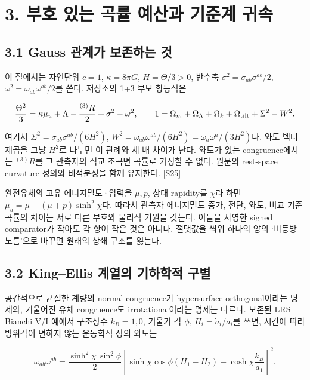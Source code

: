 \documentclass[11pt,a4paper]{article}
\begin{document}
\hypertarget{s3}{}

\section*{3. 부호 있는 곡률 예산과 기준계 귀속}


\subsection*{3.1 Gauss 관계가 보존하는 것}

이 절에서는 자연단위 \(c=1\), \(\kappa=8\pi G\), \(H=\Theta/3>0\), 반수축 \(\sigma^2=\sigma_{ab}\sigma^{ab}/2\), \(\omega^2=\omega_{ab}\omega^{ab}/2\)를 쓴다. 저장소의 1+3 부모 항등식은


\[
\frac{\Theta^2}{3}=\kappa\mu_u+\Lambda-\frac{{}^{(3)}R}{2}
+\sigma^2-\omega^2,
\qquad
1=\Omega_m+\Omega_\Lambda+\Omega_k+\Omega_{\rm tilt}+\Sigma^2-W^2.
\]

여기서 \(\Sigma^2=\sigma_{ab}\sigma^{ab}/(6H^2)\), \(W^2=\omega_{ab}\omega^{ab}/(6H^2)=\omega_a\omega^a/(3H^2)\)다. 와도 벡터 제곱을 그냥 \(H^2\)로 나누면 이 관례와 세 배 차이가 난다. 와도가 있는 congruence에서는 \({}^{(3)}R\)를 그 관측자의 직교 초곡면 곡률로 가정할 수 없다. 원문의 rest-space curvature 정의와 비적분성을 함께 유지한다. \hyperlink{src:S25}{[S25]}


완전유체의 고유 에너지밀도·압력을 \(\mu,p\), 상대 rapidity를 \(\chi\)라 하면 \(\mu_u=\mu+(\mu+p)\sinh^2\chi\)다. 따라서 관측자 에너지밀도 증가, 전단, 와도, 비교 기준 곡률의 차이는 서로 다른 부호와 물리적 기원을 갖는다. 이들을 사영한 signed comparator가 작아도 각 항이 작은 것은 아니다. 절댓값을 씌워 하나의 양의 ‘비등방 노름’으로 바꾸면 원래의 상쇄 구조를 잃는다.


\subsection*{3.2 King–Ellis 계열의 기하학적 구별}

공간적으로 균질한 계량의 normal congruence가 hypersurface orthogonal이라는 명제와, 기울어진 유체 congruence도 irrotational이라는 명제는 다르다. 보존된 LRS Bianchi V/I 예에서 구조상수 \(k_B=1,0\), 기울기 각 \(\phi\), \(H_i=\dot a_i/a_i\)를 쓰면, 시간에 따라 방위각이 변하지 않는 운동학적 장의 와도는


\[
\omega_{ab}\omega^{ab}=
\frac{\sinh^2\chi\,\sin^2\phi}{2}
\left[\sinh\chi\cos\phi(H_1-H_2)-\cosh\chi\frac{k_B}{a_1}\right]^2.
\]
\end{document}
